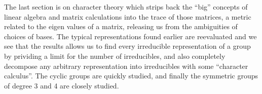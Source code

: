 	The last section is on character theory which strips back the ``big'' concepts of linear algebra and matrix calculations into the trace of those matrices, a metric related to the eigen values of a matrix, releasing us from the ambiguities of choices of bases. The typical representations found earlier are reevaluated and we see that the results allows us to find every irreducible representation of a group by prividing a limit for the number of irreducibles, and also completely decompose any arbitrary representation into irreducibles with some ``character calculus''. The cyclic groups are quickly studied, and finally the symmetric groups of degree 3 and 4 are closely studied.